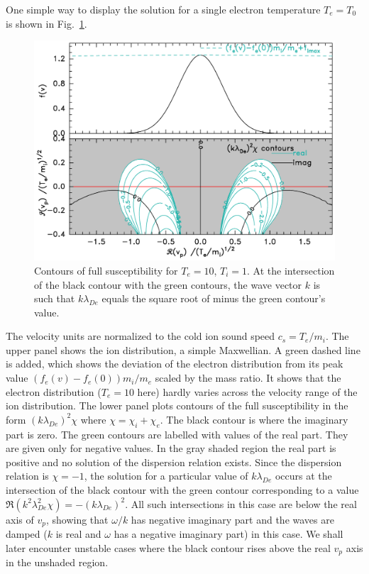 \documentclass[12pt]{article}
\begin{document}
One simple way to display the solution for a single electron temperature
$T_e=T_0$ is shown in Fig.\ \ref{maxwellian}. 
\begin{figure}[htp]
  \centering
  \includegraphics[width=0.7\hsize]{maxwellian}
  \caption{Contours of full susceptibility for $T_e=10$, $T_i=1$.  At
    the intersection of the black contour with the green contours, the
    wave vector $k$ is such that $k\lambda_{De}$ equals the square
    root of minus the green contour's value.}
  \label{maxwellian}
\end{figure}
The velocity units are normalized to the cold ion sound speed
$c_{s}=T_e/m_i$.  The upper panel shows the ion distribution, a simple
Maxwellian. A green dashed line is added, which shows the deviation of
the electron distribution from its peak value $(f_e(v)-f_e(0))m_i/m_e$
scaled by the mass ratio. It shows that the electron distribution
($T_e=10$ here) hardly varies across the velocity range of the ion
distribution. The lower panel plots contours of the full
susceptibility in the form $(k\lambda_{De})^2\chi$ where
$\chi=\chi_i+\chi_e$. The black contour is where the imaginary part is
zero. The green contours are labelled with values of the real
part. They are given only for negative values. In the gray shaded
region the real part is positive and no solution of the dispersion
relation exists.  Since the dispersion relation is $\chi=-1$, the
solution for a particular value of $k\lambda_{De}$ occurs at the
intersection of the black contour with the green contour corresponding
to a value $\Re(k^2\lambda_{De}^2\chi)=-(k\lambda_{De})^2$.  All such
intersections in this case are below the real axis of $v_p$, showing
that $\omega/k$ has negative imaginary part and the waves are damped
($k$ is real and $\omega$ has a negative imaginary part) in this
case. We shall later encounter unstable cases where the black contour
rises above the real $v_p$ axis in the unshaded region.
\end{document}
